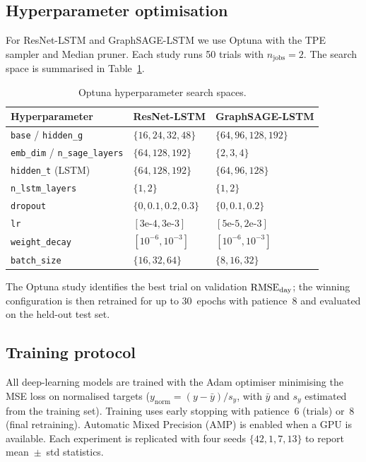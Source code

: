 \subsection{Hyperparameter optimisation}
\label{ssec:optuna}

For ResNet-LSTM and GraphSAGE-LSTM we use Optuna \cite{akiba2019} with the TPE
sampler and Median pruner. Each study runs 50 trials with $n_\text{jobs}=2$.
The search space is summarised in Table~\ref{tab:hpspace}.

\begin{table}[t]
  \centering
  \caption{Optuna hyperparameter search spaces.}
  \label{tab:hpspace}
  \setlength{\tabcolsep}{4pt}
  \begin{tabular}{lll}
    \toprule
    \textbf{Hyperparameter} & \textbf{ResNet-LSTM} & \textbf{GraphSAGE-LSTM} \\
    \midrule
    \texttt{base} / \texttt{hidden\_g}  & $\{16,24,32,48\}$   & $\{64,96,128,192\}$ \\
    \texttt{emb\_dim} / \texttt{n\_sage\_layers} & $\{64,128,192\}$ & $\{2,3,4\}$   \\
    \texttt{hidden\_t} (LSTM)  & $\{64,128,192\}$  & $\{64,96,128\}$    \\
    \texttt{n\_lstm\_layers}   & $\{1,2\}$         & $\{1,2\}$          \\
    \texttt{dropout}           & $\{0,0.1,0.2,0.3\}$ & $\{0,0.1,0.2\}$  \\
    \texttt{lr}                & $[3\text{e-}4, 3\text{e-}3]$ & $[5\text{e-}5, 2\text{e-}3]$ \\
    \texttt{weight\_decay}     & $[10^{-6}, 10^{-3}]$ & $[10^{-6}, 10^{-3}]$ \\
    \texttt{batch\_size}       & $\{16,32,64\}$    & $\{8,16,32\}$      \\
    \bottomrule
  \end{tabular}
\end{table}

The Optuna study identifies the best trial on validation $\text{RMSE}_\text{day}$; the winning
configuration is then retrained for up to 30~epochs with patience~8 and evaluated
on the held-out test set.

\subsection{Training protocol}

All deep-learning models are trained with the Adam optimiser minimising the MSE
loss on normalised targets ($y_\text{norm} = (y - \bar{y}) / s_y$, with $\bar{y}$
and $s_y$ estimated from the training set). Training uses early stopping with
patience~6 (trials) or~8 (final retraining). Automatic Mixed Precision (AMP) is
enabled when a GPU is available. Each experiment is replicated with four seeds
$\{42, 1, 7, 13\}$ to report mean~$\pm$~std statistics.

